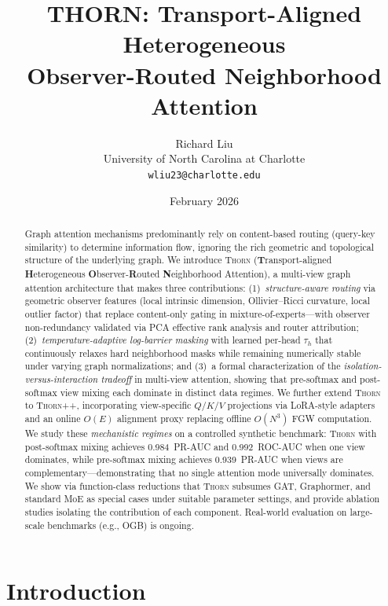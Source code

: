 \documentclass[11pt,a4paper]{article}
\title{%
  \textsc{THORN}: Transport-Aligned Heterogeneous\\
  Observer-Routed Neighborhood Attention}
\author{%
  Richard Liu\\
  University of North Carolina at Charlotte\\
  \texttt{wliu23@charlotte.edu}
}
\date{February 2026}
\newcommand{\thorn}{\textsc{Thorn}}
\newcommand{\thornpp}{\textsc{Thorn++}}
\begin{document}
\maketitle

\begin{abstract}
Graph attention mechanisms predominantly rely on content-based routing
(query-key similarity) to determine information flow, ignoring the rich
geometric and topological structure of the underlying graph.
We introduce \thorn{} (\textbf{T}ransport-aligned \textbf{H}eterogeneous
\textbf{O}bserver-\textbf{R}outed \textbf{N}eighborhood Attention),
a multi-view graph attention architecture that makes three contributions:
(1)~\emph{structure-aware routing} via geometric observer features
(local intrinsic dimension, Ollivier--Ricci curvature, local outlier
factor) that replace content-only gating in mixture-of-experts---with
observer non-redundancy validated via PCA effective rank analysis and
router attribution;
(2)~\emph{temperature-adaptive log-barrier masking} with learned
per-head $\tau_h$ that continuously relaxes hard neighborhood masks while
remaining numerically stable under varying graph normalizations; and
(3)~a formal characterization of the \emph{isolation-versus-interaction
tradeoff} in multi-view attention, showing that pre-softmax and
post-softmax view mixing each dominate in distinct data regimes.
We further extend \thorn{} to \thornpp{}, incorporating view-specific
$Q/K/V$ projections via LoRA-style adapters and an online $O(E)$
alignment proxy replacing offline $O(N^3)$ FGW computation.
We study these \emph{mechanistic regimes} on a controlled synthetic
benchmark: \thorn{} with post-softmax mixing achieves
0.984~PR-AUC and 0.992~ROC-AUC when one view dominates, while
pre-softmax mixing achieves 0.939~PR-AUC when views are
complementary---demonstrating that no single attention mode universally
dominates.
We show via function-class reductions that \thorn{} subsumes GAT,
Graphormer, and standard MoE as special cases under suitable parameter
settings, and provide ablation studies isolating the contribution of each
component.
Real-world evaluation on large-scale benchmarks (e.g., OGB) is ongoing.
\end{abstract}

\section{Introduction}
\label{sec:intro}
\end{document}
